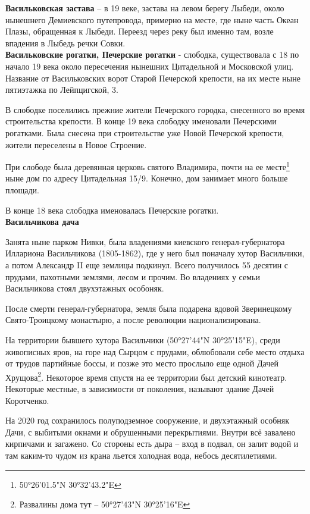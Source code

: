 \textbf{Васильковская застава} – в 19 веке, застава на левом берегу Лыбеди, около нынешнего Демиевского путепровода, примерно на месте, где ныне часть Океан Плазы, обращенная к Лыбеди. Переезд через реку был именно там, возле впадения в Лыбедь речки Совки.\\

\textbf{Васильковские рогатки, Печерские рогатки} - слободка, существовала с 18 по начало 19 века около пересечения нынешних Цитадельной и Московской улиц. Название от Васильковских ворот Старой Печерской крепости, на их месте ныне пятиэтажка по Лейпцигской, 3. 

В слободке поселились прежние жители Печерского городка, снесенного во время строительства крепости. В конце 19 века слободку именовали Печерскими рогатками. Была снесена при строительстве уже Новой Печерской крепости, жители переселены в Новое Строение.

При слободе была деревянная церковь святого Владимира, почти на ее месте\footnote{50°26'01.5"N 30°32'43.2"E} ныне дом по адресу Цитадельная 15/9. Конечно, дом занимает много больше площади.

В конце 18 века слободка именовалась Печерские рогатки.
\\


\textbf{Васильчикова дача}

Занята ныне парком Нивки, была владениями киевского генерал-губернатора Иллариона Васильчикова (1805-1862), где у него был поначалу хутор Васильчики, а потом Александр II еще землицы подкинул. Всего получилось 55 десятин с прудами, пахотными землями, лесом и прочим. Во владениях у семьи Васильчикова стоял двухэтажных особоняк.
 
После смерти генерал-губернатора, земля была подарена вдовой Зверинецкому Свято-Троицкому монастырю, а после революции национализирована. 

На территории бывшего хутора Васильчики (50°27'44"N 30°25'15"E), среди живописных яров, на горе над Сырцом с прудами, облюбовали себе место отдыха от трудов партийные боссы, и позже это место прослыло еще одной Дачей Хрущова\footnote{Развалины дома тут – 50°27'43"N 30°25'16"E}. Некоторое время спустя на ее территории был детский кинотеатр. Некоторые местные, в зависимости от поколения, называют здание Дачей Коротченко.

На 2020 год сохранилось полуподземное сооружение, и двухэтажный особняк Дачи, с выбитыми окнами и обрушенными перекрытиями. Внутри всё завалено кирпичами и загажено. Со стороны есть дыра – вход в подвал, он залит водой и там каким-то чудом из крана льется холодная вода, небось десятилетиями.

